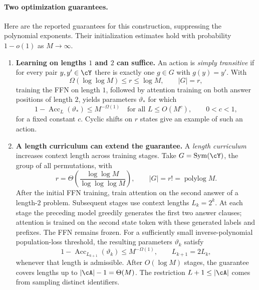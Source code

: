 \documentclass[11pt,twoside]{article}
\theoremstyle{definition}
\theoremstyle{remark}
\begin{document}
\paragraph{Two optimization guarantees.}
Here are the reported guarantees for this construction, suppressing the
polynomial exponents. Their initialization estimates hold with probability
$1-o(1)$ as $M\to\infty$.
\begin{enumerate}[label=(\roman*),leftmargin=*]
\item \textbf{Learning on lengths $1$ and $2$ can suffice.}
An action is \emph{simply transitive} if for every pair $y,y'\in\cY$
there is exactly one $g\in G$ with $g(y)=y'$. With
\[
\Omega(\log\log M)\le r\le\log M,
\qquad |G|=r,
\]
training the FFN on length $1$, followed by attention training on both
answer positions of length $2$, yields parameters $\vartheta_*$ for which
\begin{equation}
1-\operatorname{Acc}_L(\vartheta_*)\le M^{-\Omega(1)}
\quad\text{for all }L\le O(M^c),
\qquad 0<c<1,
\label{eq:state-tracking-short-long}
\end{equation}
for a fixed constant $c$. Cyclic shifts on $r$ states give an example of
such an action.

\item \textbf{A length curriculum can extend the guarantee.}
A \emph{length curriculum} increases context length across training stages.
Take $G=\operatorname{Sym}(\cY)$, the group of all permutations, with
\[
r=\Theta\!\left(\frac{\log\log M}{\log\log\log M}\right),
\qquad |G|=r!=\operatorname{polylog}M.
\]
After the initial FFN training, train attention on the second answer of a
length-$2$ problem. Subsequent stages use context lengths $L_k=2^k$.
At each stage the preceding model greedily generates the first two answer
clauses; attention is trained on the second state token with these generated
labels and prefixes. The FFN remains frozen. For a sufficiently small
inverse-polynomial population-loss threshold, the resulting parameters
$\vartheta_k$ satisfy
\begin{equation}
1-\operatorname{Acc}_{L_{k+1}}(\vartheta_k)
\le M^{-\Omega(1)},\qquad L_{k+1}=2L_k,
\label{eq:state-tracking-curriculum}
\end{equation}
whenever that length is admissible. After $O(\log M)$ stages, the guarantee
covers lengths up to $|\cA|-1=\Theta(M)$. The restriction
$L+1\le|\cA|$ comes from sampling distinct identifiers.
\end{enumerate}
\end{document}
